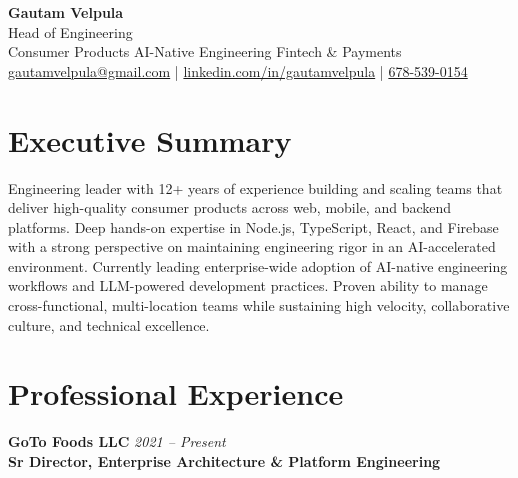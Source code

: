 \documentclass[11pt]{article}
\begin{document}
\begin{center}
    {\LARGE \textbf{Gautam Velpula}} \\[4pt]
    Head of Engineering \\[6pt]
    Consumer Products \textbullet{} AI-Native Engineering \textbullet{} Fintech \& Payments \\[6pt]
    \href{mailto:gautamvelpula@gmail.com}{gautamvelpula@gmail.com} \;|\;
    \href{https://www.linkedin.com/in/gautamvelpula}{linkedin.com/in/gautamvelpula} \;|\;
    \href{tel:6785390154}{678-539-0154}
  \end{center}

\vspace{8pt}

\section*{Executive Summary}
Engineering leader with 12+ years of experience building and scaling teams that deliver high-quality consumer products across web, mobile, and backend platforms. Deep hands-on expertise in Node.js, TypeScript, React, and Firebase with a strong perspective on maintaining engineering rigor in an AI-accelerated environment. Currently leading enterprise-wide adoption of AI-native engineering workflows and LLM-powered development practices. Proven ability to manage cross-functional, multi-location teams while sustaining high velocity, collaborative culture, and technical excellence.

\section*{Professional Experience}

\textbf{GoTo Foods LLC} \hfill \textit{2021 -- Present} \\
\textbf{Sr Director, Enterprise Architecture \& Platform Engineering}
\end{document}
